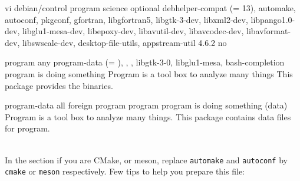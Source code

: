 {\footnotesize{
\begin{script}
 vi debian/control
 program
 science
 optional
 
 
 debhelper-compat (= 13),
                  automake,
                  autoconf,
                  pkgconf,
                  gfortran,
                  libgfortran5,
                  libgtk-3-dev,
                  libxml2-dev,
                  libpango1.0-dev,
                  libglu1-mesa-dev,
                  libepoxy-dev,
                  libavutil-dev,
                  libavcodec-dev,
                  libavformat-dev,
                  libswscale-dev,
                  desktop-file-utils,
                  appstream-util
 4.6.2
 
 \var{\gitprog}
 
 no

 program
 any
	 program-data (= ),
          , ,
          libgtk-3-0,
          libglu1-mesa,
          bash-completion
 program is doing something
 Program is a tool box to analyze many things
 This package provides the binaries.

 program-data
 all
 foreign
 
 program
 program
 program is doing something (data)
 Program is a tool box to analyze many things.
 This package contains data files for program.
\end{script}
}} \\[-0.75cm]
\noindent In the  section if you are CMake, or meson, replace \texttt{automake} and \texttt{autoconf} by \texttt{cmake} or \texttt{meson} respectively. 
\newpage
\noindent Few tips to help you prepare this file:
